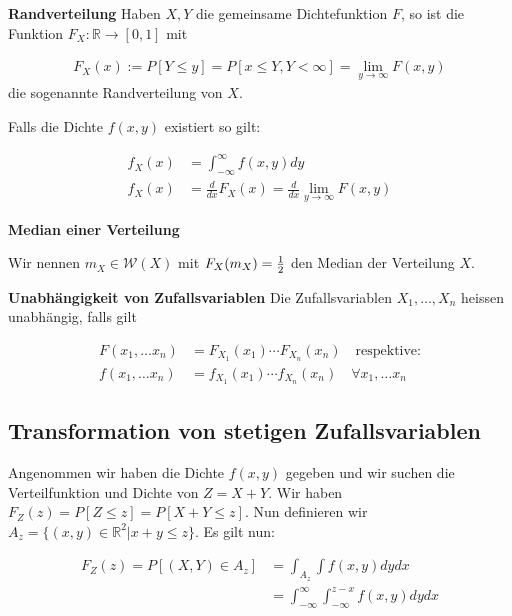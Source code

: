 \documentclass[25pt]{sciposter}
\newcommand{\R}{\mathbb{R}}
\newcommand{\W}{\mathcal{W}}
\newenvironment{method}[1]{\begin{mdframed}[backgroundcolor=blue!10,innertopmargin=15pt, innerbottommargin=15pt,nobreak=true]
		\textbf{#1 }
	}
	{ 
	\end{mdframed}
}
\begin{document}
\begin{multicols}{3}
\begin{method}{Randverteilung} Haben $X,Y$ die gemeinsame Dichtefunktion $F$, so ist die Funktion $F_X : \R \to [0,1]$ mit 
	
\begin{align*}
	F_X(x) := P[Y \leq y] = P[x\leq Y, Y < \infty] = \lim_{y \to \infty} F(x,y)
\end{align*}
die sogenannte Randverteilung von $X$.

Falls die Dichte $f(x,y)$ existiert so gilt:

\begin{align*}
	f_X(x) &= \int_{-\infty}^{\infty}f(x,y) dy\\
	f_X(x) &= \frac{d}{dx}F_X(x) = \frac{d}{dx}\lim_{y \to \infty} F(x,y)
\end{align*}

\end{method}


\textbf{Median einer Verteilung}

Wir nennen $m_X \in \W(X)$ mit $F_X(m_X) = {1 \over 2}$ den Median der Verteilung $X$.

\begin{method}{Unabhängigkeit von Zufallsvariablen} Die Zufallsvariablen $X_1,\ldots, X_n$ heissen unabhängig, falls gilt
	
	\begin{align*}
F(x_1,\ldots x_n) &= F_{X_1}(x_1) \cdots F_{X_n}(x_n) \quad \text{respektive:}\\
f(x_1,\ldots x_n) &= f_{X_1}(x_1) \cdots f_{X_n}(x_n) \quad \forall x_1,\ldots x_n
	\end{align*}
\end{method}


\subsection*{Transformation von stetigen Zufallsvariablen}

Angenommen wir haben die Dichte $f(x,y)$ gegeben und wir suchen die Verteilfunktion und Dichte von $Z = X + Y$. Wir haben $F_Z(z) = P[Z \leq z] = P[X+Y\leq z]$. Nun definieren wir $A_z = \{(x,y)\in\R^2|x+y\leq z\}$. Es gilt nun:

\begin{align*}
	F_Z(z) = P[(X,Y)\in A_z] &= \int_{A_z} \int f(x,y) dy dx\\
	&= \int_{-\infty}^{\infty} \int_{-\infty}^{z-x} f(x,y) dy dx
\end{align*}


\end{multicols}
\end{document}
